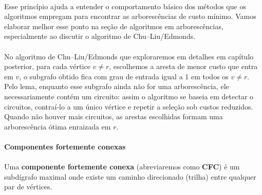 \documentclass[12pt,a4paper]{article}
\begin{document}
\paragraph{}
Esse princípio ajuda a entender o comportamento básico dos métodos que os algoritmos empregam para encontrar as arborescências de custo mínimo. Vamos elaborar melhor esse ponto na seção de algoritmos em arborescências, especialmente ao discutir o algoritmo de Chu--Liu/Edmonds.

\paragraph{}
No algoritmo de Chu--Liu/Edmonds que exploraremos em detalhes em capítulo posterior, para cada vértice \(v\neq r\), escolhemos a aresta de menor custo que entra em \(v\), o subgrafo obtido fica com grau de entrada igual a 1 em todos os \(v\neq r\). Pelo lema, enquanto esse subgrafo ainda não for uma arborescência, ele necessariamente contém um circuito: assim o algoritmo se baseia em detectar o circuitos, contraí-lo a um único vértice e repetir a seleção sob custos reduzidos. Quando não houver mais circuitos, as arestas escolhidas formam uma arborescência ótima enraizada em \(r\).

\paragraph{Componentes fortemente conexas}
\paragraph{}Uma \textbf{componente fortemente conexa} (abreviaremos como \textbf{CFC}) é um subdígrafo maximal onde existe um caminho direcionado (trilha) entre qualquer par de vértices. 
\end{document}
